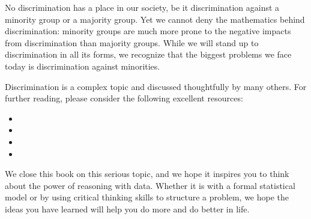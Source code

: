 
No discrimination has a place in our society,
be it discrimination against a minority group
or a majority group.
Yet we cannot deny the mathematics behind
discrimination: minority groups are much more
prone to the negative impacts from discrimination
than majority groups.
While we will stand up to discrimination in all
its forms, we recognize that the biggest problems
we face today is discrimination against minorities.

Discrimination is a complex topic and discussed
thoughtfully by many others.
For further reading,
please consider the following excellent resources:
\begin{itemize}
\item
\item
\item
\item
\end{itemize}

We close this book on this serious topic,
and we hope it inspires you to think about
the power of reasoning with data.
Whether it is with a formal statistical model
or by using critical thinking skills to structure
a problem, we hope the ideas you have learned will
help you do more and do better in life.

